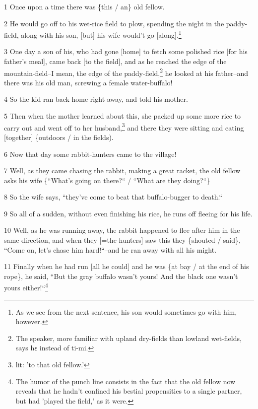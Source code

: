 
1 Once upon a time there was \{this / an\} old fellow.

2 He would go off to his wet-rice field to plow, spending the night in the paddy-field,
along with his son, [but] his wife would't go [along].\footnote{As we see from the next sentence, his son would sometimes go with him, however.}

3 One day a son of his, who had gone [home] to fetch some polished rice [for his
father's meal], came back [to the field], and as he reached the edge of the mountain-field--I
mean, the edge of the paddy-field,\footnote{The speaker, more familiar with upland dry-fields than lowland wet-fields, says hɛ instead of ti-mi.} he looked at his father--and there was his
old man, screwing a female water-buffalo!

4 So the kid ran back home right away, and told his mother.

5 Then when the mother learned about this, she packed up some more rice to carry
out and went off to her husband,\footnote{lit: 'to that old fellow.'} and there they were sitting and eating [together]
\{outdoors / in the fields).

6 Now that day some rabbit-hunters came to the village!

7 Well, as they came chasing the rabbit, making a great racket, the old fellow
asks his wife \{``What's going on there?`` / ``What are
they doing?``\}

8 So the wife says, ``they've come to beat that buffalo-bugger to death.``

9 So all of a sudden, without even finishing his rice, he runs off fleeing for
his life.

10 Well, as he was running away, the rabbit happened to flee after him in the same
direction, and when they [=the hunters] saw this they \{shouted / said\}, ``Come
on, let's chase him hard!``--and he ran away with all his might.

11 Finally when he had run [all he could] and he was \{at bay / at the end of his
rope\}, he said, ``But the gray buffalo wasn't yours! And the black one
wasn't yours either!``\footnote{The humor of the punch line consists in the fact that the old fellow now reveals that he hadn't confined his bestial propensities to a single partner, but had 'played the field,' as it were.}

